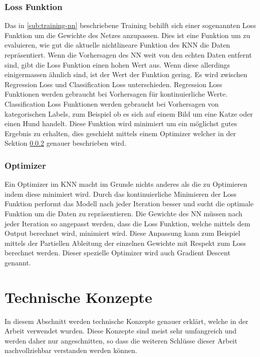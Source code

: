 \subsubsection{Loss Funktion}
\label{sub:loss_fkt}
Das in \ref{sub:training-nn} beschriebene Training behilft sich einer sogenannten Loss Funktion um die Gewichte des
Netzes anzupassen. Dies ist eine Funktion um zu evaluieren, wie gut die aktuelle nichtlineare Funktion des \gls{KNN} die
Daten repräsentiert. Wenn die Vorhersagen des \gls{NN} weit von den echten Daten entfernt sind, gibt die Loss Funktion
einen hohen Wert aus. Wenn diese allerdings einigermassen ähnlich sind, ist der Wert der Funktion gering. 
\newline
\newline
Es wird zwischen Regression Loss und Classification Loss unterschieden. Regression Loss Funktionen
werden gebraucht bei Vorhersagen für kontinuierliche Werte. Classification Loss Funktionen werden gebraucht bei
Vorhersagen von kategorischen Labels, zum Beispiel ob es sich auf einem Bild um eine Katze oder einen Hund handelt.
\newline
\newline
Diese Funktion wird minimiert um ein möglichst gutes Ergebnis zu erhalten, dies geschieht mittels einem Optimizer
welcher in der Sektion \ref{sub:optimizer} genauer beschrieben wird.

\subsubsection{Optimizer}
\label{sub:optimizer}
Ein Optimizer im \gls{KNN} macht im Grunde nichts anderes als die  zu Optimieren indem diese
minimiert wird. Durch das kontinuierliche Minimieren der Loss Funktion performt das Modell nach jeder Iteration besser
und sucht die optimale Funktion um die Daten zu repräsentieren. Die Gewichte des \gls{NN} müssen nach jeder Iteration so
angepasst werden, dass die Loss Funktion, welche mittels dem Output berechnet wird, minimiert wird. Diese Anpassung kann
zum Beispiel mittels der Partiellen Ableitung der einzelnen Gewichte mit Respekt zum Loss berechnet werden. Dieser
spezielle Optimizer wird auch Gradient Descent genannt.

\section{Technische Konzepte}
\label{sec:technische-konzepte}
In diesem Abschnitt werden technische Konzepte genauer erklärt, welche in der Arbeit verwendet wurden. Diese Konzepte
sind meist sehr umfangreich und werden daher nur angeschnitten, so dass die weiteren Schlüsse dieser Arbeit
nachvollziehbar verstanden werden können.

